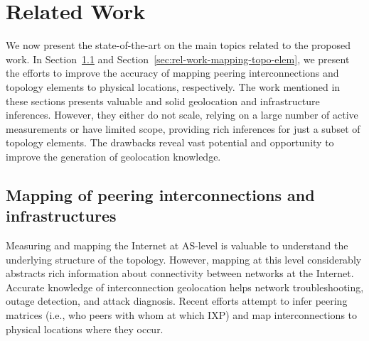 \chapter{Related Work}\label{cap:related-work}
\thispagestyle{empty}

	We now present the state-of-the-art on the main topics related to the proposed work. 
	In Section~\ref{sec:rel-work-mapping-peer} and Section~\ref{sec:rel-work-mapping-topo-elem}, we present the efforts to improve the accuracy of mapping peering interconnections and topology elements to physical locations, respectively. The work mentioned in these sections presents valuable and solid geolocation and infrastructure inferences. However, they either do not scale, relying on a large number of active measurements or have limited scope, providing rich inferences for just a subset of topology elements. The drawbacks reveal vast potential and opportunity to improve the generation of geolocation knowledge.



	\section{Mapping of peering interconnections and infrastructures}
	\label{sec:rel-work-mapping-peer}

	Measuring and mapping the Internet at AS-level is valuable to understand the underlying structure of the topology. However, mapping at this level considerably abstracts rich information about connectivity between networks at the Internet. Accurate knowledge of interconnection geolocation helps network troubleshooting, outage detection, and attack diagnosis. Recent efforts attempt to infer peering matrices (i.e., who peers with whom at which IXP) and map interconnections to physical locations where they occur. 

